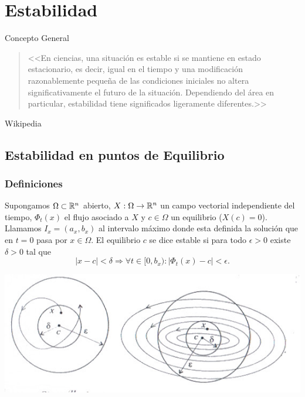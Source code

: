 

\chapter{Estabilidad}







{Concepto General}

\begin{quotation}
              
    <<En ciencias, una situación es estable si se mantiene en estado estacionario, es decir, igual en el tiempo 
    y una modificación razonablemente pequeña de las condiciones iniciales no altera significativamente  el
    futuro de la situación. Dependiendo del área en particular, estabilidad tiene significados ligeramente
    diferentes.>> 
    \end{quotation} 
    \begin{flushright}
     Wikipedia
    \end{flushright}



\section{Estabilidad en puntos de Equilibrio}

\subsection{Definiciones}

\begin{definicion} 
	      Supongamos $\Omega\subset\mathbb{R}^n$ abierto, $X:\Omega\to\mathbb{R}^n$ un campo vectorial independiente del tiempo, 
	      $\Phi_t(x)$ el flujo asociado a  $X$ 	      y $c\in \Omega$ 
	      un equilibrio ($X(c)=0$). Llamamos $I_x=(a_x,b_x)$ al intervalo máximo donde esta definida la solución 
	      que en $t=0$ pasa por $x\in\Omega$. El equilibrio $c$ se dice estable si para todo $\epsilon>0$ existe 
	      $\delta>0$ tal que 
	      \[|x-c|<\delta\Rightarrow \forall t\in [0,b_x):|\Phi_t(x)-c|<\epsilon.\]
\end{definicion}		
              
             





\begin{center}
  \includegraphics[scale=.5]{imagenes/circulo.jpg}
\end{center}

